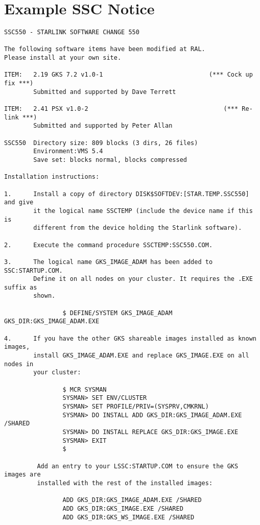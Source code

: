 \section {Example SSC Notice}
\label{se:ex.note}
\begin{verbatim}
SSC550 - STARLINK SOFTWARE CHANGE 550

The following software items have been modified at RAL.
Please install at your own site.

ITEM:   2.19 GKS 7.2 v1.0-1                             (*** Cock up fix ***)
        Submitted and supported by Dave Terrett

ITEM:   2.41 PSX v1.0-2                                     (*** Re-link ***)
        Submitted and supported by Peter Allan

SSC550  Directory size: 809 blocks (3 dirs, 26 files)
        Environment:VMS 5.4
        Save set: blocks normal, blocks compressed

Installation instructions:

1.      Install a copy of directory DISK$SOFTDEV:[STAR.TEMP.SSC550] and give 
        it the logical name SSCTEMP (include the device name if this is 
        different from the device holding the Starlink software).

2.      Execute the command procedure SSCTEMP:SSC550.COM.

3.      The logical name GKS_IMAGE_ADAM has been added to SSC:STARTUP.COM.
        Define it on all nodes on your cluster. It requires the .EXE suffix as
        shown.

                $ DEFINE/SYSTEM GKS_IMAGE_ADAM GKS_DIR:GKS_IMAGE_ADAM.EXE

4.      If you have the other GKS shareable images installed as known images, 
        install GKS_IMAGE_ADAM.EXE and replace GKS_IMAGE.EXE on all nodes in 
        your cluster:

                $ MCR SYSMAN
                SYSMAN> SET ENV/CLUSTER
                SYSMAN> SET PROFILE/PRIV=(SYSPRV,CMKRNL)
                SYSMAN> DO INSTALL ADD GKS_DIR:GKS_IMAGE_ADAM.EXE /SHARED
                SYSMAN> DO INSTALL REPLACE GKS_DIR:GKS_IMAGE.EXE
                SYSMAN> EXIT
                $

         Add an entry to your LSSC:STARTUP.COM to ensure the GKS images are 
         installed with the rest of the installed images:

                ADD GKS_DIR:GKS_IMAGE_ADAM.EXE /SHARED
                ADD GKS_DIR:GKS_IMAGE.EXE /SHARED
                ADD GKS_DIR:GKS_WS_IMAGE.EXE /SHARED


\end{verbatim}
